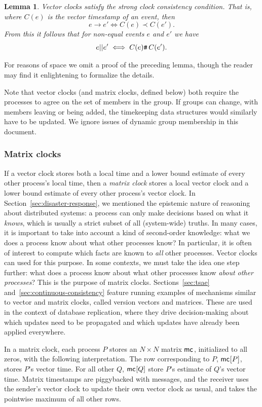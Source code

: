 \documentclass[]             %
{NASA}                       %
\newtheorem{lemma}[theorem]{Lemma}
\theoremstyle{definition}
\begin{document}
\begin{lemma}
  Vector clocks satisfy the strong clock consistency condition. That
  is, where $C(e)$ is the vector timestamp of an event, then
  \[ e \to e' \iff C(e) \prec C(e'). \]
  From this it follows that for non-equal events $e$ and $e'$ we have
  \[e || e' \iff {C(e) \texttt{\#}\,C(e')}. \]%
\end{lemma}

For reasons of space we omit a proof of the preceding lemma, though
the reader may find it enlightening to formalize the details.

Note that vector clocks (and matrix clocks, defined below) both require the processes
to agree on the set of members in the group. If groups can change,
with members leaving or being added, the timekeeping data structures
would similarly have to be updated. We ignore issues of dynamic group
membership in this document.

\subsubsection{Matrix clocks}
\label{sssec:matrix-clocks}
If a vector clock stores both a local time and a lower bound estimate
of every other process's local time, then a \emph{matrix clock} stores a
local vector clock and a lower bound estimate of every other process's
vector clock. In Section~\ref{sec:disaster-response}, we mentioned the epistemic nature of
reasoning about distributed systems: a process can only make decisions
based on what it \emph{knows}, which is usually a strict subset of all
(system-wide) truths. In many cases, it is important to take into
account a kind of second-order knowledge: what we does a process know
about what other processes know? In particular, it is often of interest to compute which facts are known to \emph{all} other processes. Vector clocks can used for this purpose. In some contexts, we must take the idea one step further: what does a process know about what other processes know \emph{about other processes}? This is the purpose of matrix clocks. Sections~\ref{sec:tsae} and~\ref{sec:continuous-consistency} feature running examples of mechanisms similar to vector and matrix clocks, called version vectors and matrices. These are used in the context of database replication, where they drive decision-making about which updates need to be propagated and which updates have already been applied everywhere.

In a matrix clock, each process $P$ stores an $N\times{}N$ matrix
$\mathsf{mc}^{}{}{}$, initialized to all zeros, with the following
interpretation. The row corresponding to $P$, $\mathsf{mc}^{}{[P]}{}$,
stores $P$'s vector time. For all other $Q$, $\mathsf{mc}^{}{[Q]}{}$ store $P$'s
estimate of $Q$'s vector time. Matrix timestamps are piggybacked
with messages, and the receiver uses the sender's vector clock to
update their own vector clock as usual, and takes the pointwise
maximum of all other rows.
\end{document}
